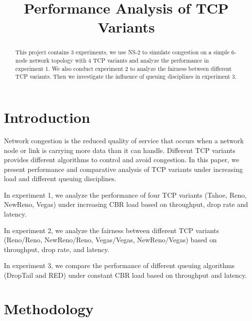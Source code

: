 \documentclass[10pt, conference]{IEEEtran}
\begin{document}
	\title{Performance Analysis of TCP Variants}
	\author{
	}
	\maketitle
	\begin{abstract}
	This project contains 3 experiments, we use NS-2 to simulate congestion on a simple 6-node network topology with 4 TCP variants and analyze the performance in experiment 1. We also conduct experiment 2 to analyze the fairness between different TCP variants. Then we investigate the influence of queuing disciplines in experiment 3.
	\end{abstract}
	
	
	\section{Introduction}
	Network congestion is the reduced quality of service that occurs when a network node or link is carrying more data than it can handle. Different TCP variants provides different algorithms to control and avoid congestion. In this paper, we present performance and comparative analysis of TCP variants under increasing load and different queuing disciplines.
	
	In experiment 1, we analyze the performance of four TCP variants (Tahoe, Reno, NewReno, Vegas) under increasing CBR load based on throughput, drop rate and latency.
	
	In experiment 2, we analyze the fairness between different TCP variants (Reno/Reno, NewReno/Reno, Vegas/Vegas, NewReno/Vegas) based on throughput, drop rate, and latency.
	
	In experiment 3, we compare the performance of different queuing algorithms (DropTail and RED) under constant CBR load based on throughput and latency.
	
	\section{Methodology}
\end{document}
